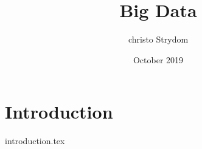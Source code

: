 \documentclass{book}
\title{Big Data}
\author{christo Strydom}
\date{October 2019}
\begin{document}
\maketitle

\chapter{Introduction}
{introduction.tex}



\end{document}
